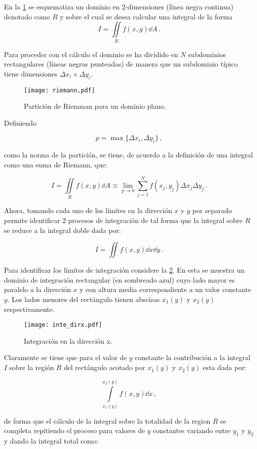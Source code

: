 En la \cref{fig:rieman} se esquematiza un dominio en 2-dimensiones (línea negra continua) denotado como $R$ y sobre el cual se desea calcular una integral de la forma
\[I = \iint\limits_R f(x,y) \dd{A}\, . \]

Para proceder con el cálculo el dominio se ha dividido en $N$ subdominios 
rectangulares (líneas negras punteadas) de manera que un subdominio típico 
tiene dimensiones $\Delta {x_i} \times \Delta {y_i}$.

\begin{figure}[H]
\centering
\texttt{[image: riemann.pdf]}
\caption{Partición de Riemman para un dominio plano.}
\label{fig:rieman}
\end{figure}

Definiendo

\[p = \max\{ \Delta {x_i}, \Delta {y_i} \}\, ,\]

como la norma de la partición, se tiene, de acuerdo a la definición de una integral como una suma de Riemann, que:

\[I = \iint\limits_R  f(x,y) \dd{A}  \equiv \lim_{p \to 0} \sum_{j=1}^N f(x_j,y_j) \Delta x_j \Delta y_j\, .\]

Ahora, tomando cada uno de los límites en la dirección $x$ y $y$ por separado permite identificar 2 procesos de integración de tal forma que la integral sobre $R$ se reduce a la integral doble dada por:

\[I = \iint f(x,y) \dd{x}\dd{y}\, . \]

Para identificar los límites de integración considere la \cref{fig:dirx}. En esta se muestra un dominio de integración rectangular (en sombreado azul) cuyo lado mayor es paralelo a la dirección $x$ y con altura media correspondiente a un valor constante $y$. Los lados menores del rectángulo tienen abscisas $x_1(y)$ y $x_2(y)$ respectivamente.
\begin{figure}[H]
\centering
\texttt{[image: inte\_dirx.pdf]}
\caption{Integración en la dirección x.}
\label{fig:dirx}
\end{figure}

Claramente se tiene que para el valor de $y$ constante la contribución a la integral $I$ sobre la región $R$ del rectángulo acotado por ${x_1}(y)$ y ${x_2}(y)$ esta dada por:

\[\int\limits_{x_1(y)}^{x_2(y)} f(x,y) \dd{x}\, ,\]

de forma que el cálculo de la integral sobre la totalidad de la region $R$ se completa repitiendo el proceso para valores de $y$ constantes variando entre $y_1$ y $y_2$ y dando la integral total como:

